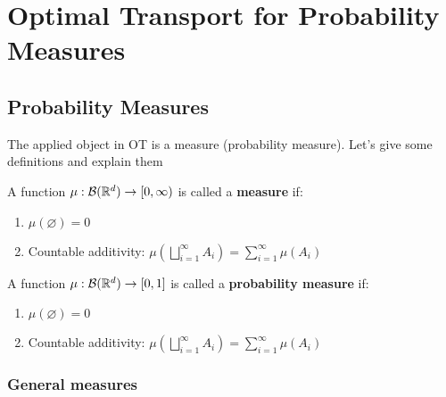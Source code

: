 \newpage

\section{Optimal Transport for Probability Measures}

\subsection{Probability Measures}

The applied object in OT is a measure (probability measure).
Let's give some definitions and explain them

\begin{definition}[Measure]
  A function $\mu : \mathcal{B}(\mathbb{R}^{d}) \to  [0, \infty)$ is called a
  \textbf{measure} if:
  \begin{enumerate}
    \item $\mu (\varnothing) = 0$
    \item Countable additivity: $\mu \left( \bigsqcup_{i=1}^{\infty} A_i \right) = \sum_{i=1}^{\infty} \mu(A_i) $
  \end{enumerate}
\end{definition}

\begin{definition}
  A function $\mu : \mathcal{B}(\mathbb{R}^{d}) \to  [0, 1]$ is called a
  \textbf{probability measure} if:
  \begin{enumerate}
    \item $\mu (\varnothing) = 0$
    \item Countable additivity: $\mu \left( \bigsqcup_{i=1}^{\infty} A_i \right) = \sum_{i=1}^{\infty} \mu(A_i) $
  \end{enumerate}
\end{definition}

\subsubsection{General measures}


